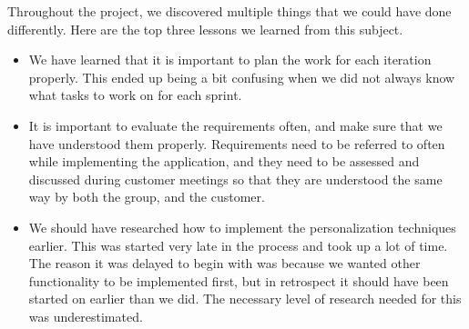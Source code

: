 Throughout the project, we discovered multiple things that we could have done differently. Here are the top three lessons we learned from this subject.

\begin{itemize}
\item We have learned that it is important to plan the work for each iteration properly. This ended up being a bit confusing when we did not always know what tasks to work on for each sprint.

\item It is important to evaluate the requirements often, and make sure that we have understood them properly. Requirements need to be referred to often while implementing the application, and they need to be assessed and discussed during customer meetings so that they are understood the same way by both the group, and the customer.

\item We should have researched how to implement the personalization techniques earlier. This was started very late in the process and took up a lot of time. The reason it was delayed to begin with was because we wanted other functionality to be implemented first, but in retrospect it should have been started on earlier than we did. The necessary level of research needed for this was underestimated.
\end{itemize}

\cleardoublepage